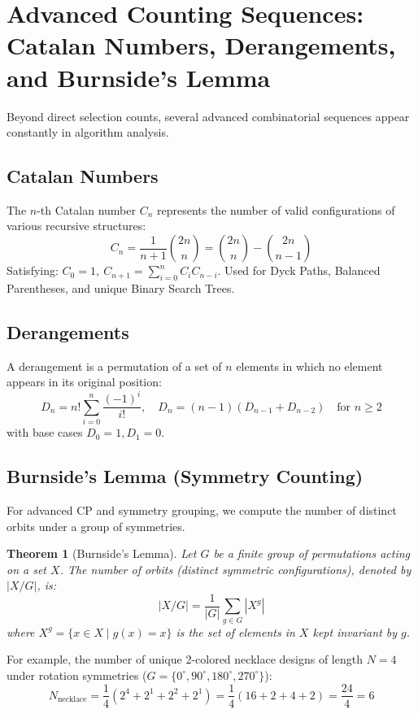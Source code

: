 \documentclass[10pt,journal,compsoc,onecolumn]{IEEEtran}
\newtheorem{theorem}{Theorem}
\begin{document}
\section{Advanced Counting Sequences: Catalan Numbers, Derangements, and Burnside's Lemma}
\label{sec:sequences}

Beyond direct selection counts, several advanced combinatorial sequences appear constantly in algorithm analysis.

\subsection{Catalan Numbers}

The $n$-th Catalan number $C_n$ represents the number of valid configurations of various recursive structures:
\begin{equation}
C_n = \frac{1}{n+1} \binom{2n}{n} = \binom{2n}{n} - \binom{2n}{n-1}
\end{equation}
Satisfying: $C_0 = 1, \ C_{n+1} = \sum_{i=0}^n C_i C_{n-i}$. Used for Dyck Paths, Balanced Parentheses, and unique Binary Search Trees.

\subsection{Derangements}

A derangement is a permutation of a set of $n$ elements in which no element appears in its original position:
\begin{equation}
D_n = n! \sum_{i=0}^{n} \frac{(-1)^i}{i!}, \quad D_n = (n-1)(D_{n-1} + D_{n-2}) \quad \text{for } n \ge 2
\end{equation}
with base cases $D_0 = 1, D_1 = 0$.

\subsection{Burnside's Lemma (Symmetry Counting)}

For advanced CP and symmetry grouping, we compute the number of distinct orbits under a group of symmetries.

\begin{theorem}[Burnside's Lemma]
Let $G$ be a finite group of permutations acting on a set $X$. The number of orbits (distinct symmetric configurations), denoted by $|X/G|$, is:
\begin{equation}
|X/G| = \frac{1}{|G|} \sum_{g \in G} |X^g|
\end{equation}
where $X^g = \{x \in X \mid g(x) = x\}$ is the set of elements in $X$ kept invariant by $g$.
\end{theorem}
For example, the number of unique 2-colored necklace designs of length $N=4$ under rotation symmetries ($G = \{0^{\circ}, 90^{\circ}, 180^{\circ}, 270^{\circ}\}$):
\begin{equation}
N_{\text{necklace}} = \frac{1}{4} \left( 2^4 + 2^1 + 2^2 + 2^1 \right) = \frac{1}{4} \left( 16 + 2 + 4 + 2 \right) = \frac{24}{4} = 6
\end{equation}
\end{document}
